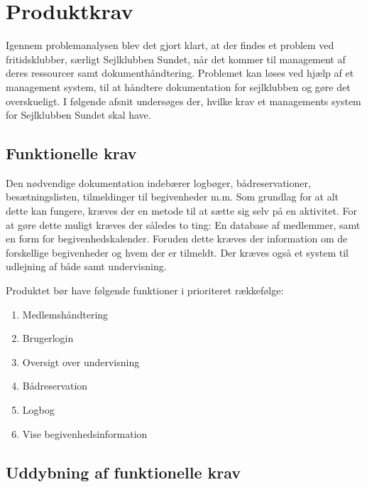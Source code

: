 \chapter{Produktkrav}

Igennem problemanalysen blev det gjort klart, at der findes et problem ved fritidsklubber, særligt Sejlklubben Sundet, når det kommer til management af deres ressourcer samt dokumenthåndtering. 
Problemet kan løses ved hjælp af et management system, til at håndtere dokumentation for sejlklubben og gøre det overskueligt. 
I følgende afsnit undersøges der, hvilke krav et managements system for Sejlklubben Sundet skal have. 


\section{Funktionelle krav} \label{sec:funktionelleKrav}

Den nødvendige dokumentation indebærer logbøger, bådreservationer, besætningslisten, tilmeldinger til begivenheder m.m. 
Som grundlag for at alt dette kan fungere, kræves der en metode til at sætte sig selv på en aktivitet. 
For at gøre dette muligt kræves der således to ting: En database af medlemmer, samt en form for begivenhedskalender. 
Foruden dette kræves der information om de forskellige begivenheder og hvem der er tilmeldt. 
Der kræves også et system til udlejning af både samt undervisning.

Produktet bør have følgende funktioner i prioriteret rækkefølge:
\begin{enumerate}
  \item Medlemshåndtering
  \item Brugerlogin
  \item Oversigt over undervisning 
  \item Bådreservation
  \item Logbog
  \item Vise begivenhedsinformation 
\end{enumerate}



\section{Uddybning af funktionelle krav}

